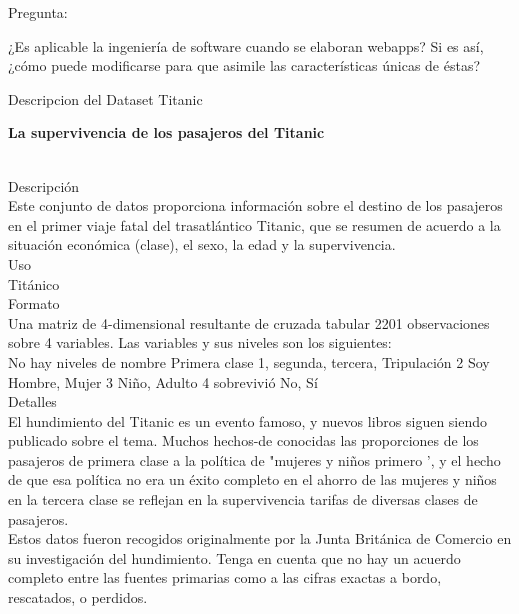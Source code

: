 \documentclass{report}
\begin{document}
\newpage
\normalsize{}
\begin{justify}

Pregunta:

¿Es aplicable la ingeniería de software cuando se elaboran webapps? Si es así, ¿cómo puede
modificarse para que asimile las características únicas de éstas?

\newpage

Descripcion del Dataset Titanic

\begin{center}\huge{}\textbf{La supervivencia de los pasajeros del Titanic\\ \ \\}\end{center}


Descripción \\

Este conjunto de datos proporciona información sobre el destino de los pasajeros en el primer viaje fatal del trasatlántico Titanic, que se resumen de acuerdo a la situación económica (clase), el sexo, la edad y la supervivencia.\\

Uso\\

  Titánico\\

Formato\\

Una matriz de 4-dimensional resultante de cruzada tabular 2201 observaciones sobre 4 variables. Las variables y sus niveles son los siguientes:\\

No hay niveles de nombre
Primera clase 1, segunda, tercera, Tripulación
2 Soy Hombre, Mujer
3 Niño, Adulto
4 sobrevivió No, Sí\\
Detalles\\

El hundimiento del Titanic es un evento famoso, y nuevos libros siguen siendo publicado sobre el tema. Muchos hechos-de conocidas las proporciones de los pasajeros de primera clase a la política de "mujeres y niños primero ', y el hecho de que esa política no era un éxito completo en el ahorro de las mujeres y niños en la tercera clase se reflejan en la supervivencia tarifas de diversas clases de pasajeros.\\

Estos datos fueron recogidos originalmente por la Junta Británica de Comercio en su investigación del hundimiento. Tenga en cuenta que no hay un acuerdo completo entre las fuentes primarias como a las cifras exactas a bordo, rescatados, o perdidos.\\


\end{justify}
\end{document}
